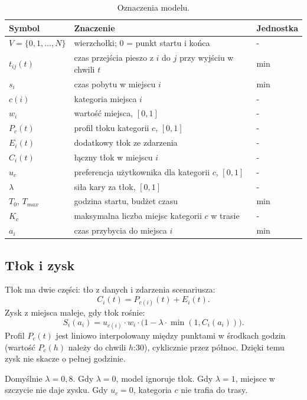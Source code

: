 \documentclass[11pt,a4paper]{article}
\begin{document}
\begin{table}[h]
\centering
\caption{Oznaczenia modelu.}
\begin{tabular}{lll}
\toprule
Symbol & Znaczenie & Jednostka \\
\midrule
$V = \{0, 1, \ldots, N\}$ & wierzchołki; 0 = punkt startu i końca & - \\
$t_{ij}(t)$ & czas przejścia pieszo z $i$ do $j$ przy wyjściu w chwili $t$ & min \\
$s_i$ & czas pobytu w miejscu $i$ & min \\
$c(i)$ & kategoria miejsca $i$ & - \\
$w_i$ & wartość miejsca, $[0,1]$ & - \\
$P_c(t)$ & profil tłoku kategorii $c$, $[0,1]$ & - \\
$E_i(t)$ & dodatkowy tłok ze zdarzenia & - \\
$C_i(t)$ & łączny tłok w miejscu $i$ & - \\
$u_c$ & preferencja użytkownika dla kategorii $c$, $[0,1]$ & - \\
$\lambda$ & siła kary za tłok, $[0,1]$ & - \\
$T_0$, $T_{max}$ & godzina startu, budżet czasu & min \\
$K_c$ & maksymalna liczba miejsc kategorii $c$ w trasie & - \\
$a_i$ & czas przybycia do miejsca $i$ & min \\
\bottomrule
\end{tabular}
\end{table}

\subsection{Tłok i zysk}

Tłok ma dwie części: tło z danych i zdarzenia scenariusza:
\begin{equation}
C_i(t) = P_{c(i)}(t) + E_i(t).
\end{equation}
Zysk z miejsca maleje, gdy tłok rośnie:
\begin{equation}
S_i(a_i) = u_{c(i)} \cdot w_i \cdot \bigl(1 - \lambda \cdot \min(1, C_i(a_i))\bigr).
\end{equation}
Profil $P_c(t)$ jest liniowo interpolowany między punktami w środkach godzin (wartość $P_c(h)$ należy do chwili $h$:30), cyklicznie przez północ. Dzięki temu zysk nie skacze o pełnej godzinie.

Domyślnie $\lambda = 0{,}8$. Gdy $\lambda = 0$, model ignoruje tłok. Gdy $\lambda = 1$, miejsce w szczycie nie daje zysku. Gdy $u_c = 0$, kategoria $c$ nie trafia do trasy.
\end{document}
